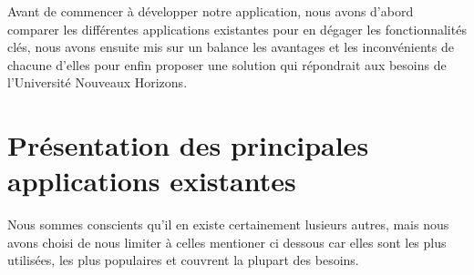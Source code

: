 Avant de commencer à développer notre application, nous avons d'abord
comparer les différentes applications existantes pour en dégager les
fonctionnalités clés, nous avons ensuite mis sur un balance les avantages
et les inconvénients de chacune d'elles pour enfin proposer une solution qui
répondrait aux besoins de l'Université Nouveaux Horizons.

\section{Présentation des principales applications existantes}\label{sec:definitions-et-concepts-cles}
Nous sommes conscients qu'il en existe certainement
lusieurs autres, mais nous avons choisi de nous limiter à celles mentioner ci dessous
car elles sont les plus utilisées, les plus populaires et couvrent la plupart des besoins.

